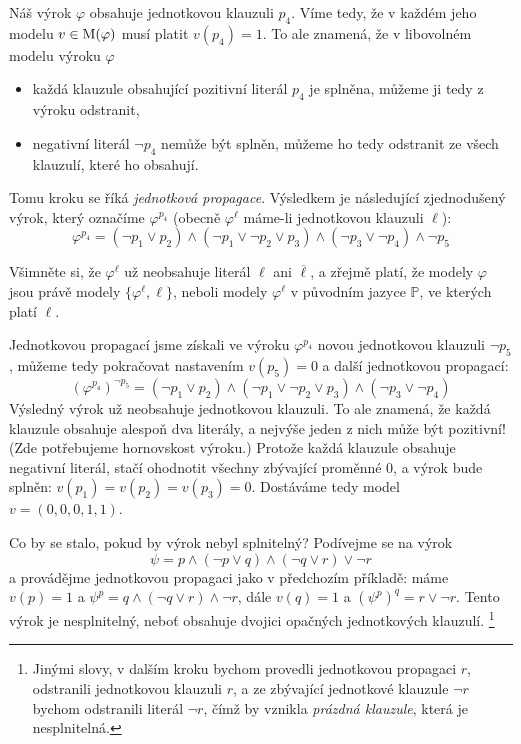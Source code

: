 Náš výrok $\varphi$ obsahuje jednotkovou klauzuli $p_4$. Víme tedy, že v každém jeho modelu $v\in\operatorname{M}(\varphi)$ musí platit $v(p_4)=1$. To ale znamená, že v libovolném modelu výroku $\varphi$
\begin{itemize}
    \item každá klauzule obsahující pozitivní literál $p_4$ je splněna, můžeme ji tedy z výroku odstranit,
    \item negativní literál $\neg p_4$ nemůže být splněn, můžeme ho tedy odstranit ze všech klauzulí, které ho obsahují. 
\end{itemize}
Tomu kroku se říká \emph{jednotková propagace}. Výsledkem je následující zjednodušený výrok, který označíme $\varphi^{p_4}$ (obecně $\varphi^\ell$ máme-li jednotkovou klauzuli $\ell$):
$$
\varphi^{p_4}=(\neg p_1\lor p_2)\land(\neg p_1\lor\neg p_2\lor p_3)\land(\neg p_3\lor\neg p_4)\land\neg p_5
$$
\begin{observation}
Všimněte si, že $\varphi^\ell$ už neobsahuje literál $\ell$ ani $\overline{\ell}$, a zřejmě platí, že modely $\varphi$ jsou právě modely $\{\varphi^{\ell},\ell\}$, neboli modely $\varphi^{\ell}$ v původním jazyce $\mathbb P$, ve kterých platí $\ell$.
\end{observation}

Jednotkovou propagací jsme získali ve výroku $\varphi^{p_4}$ novou jednotkovou klauzuli $\neg p_5$, můžeme tedy pokračovat nastavením $v(p_5)=0$ a další jednotkovou propagací:
$$
(\varphi^{p_4})^{\neg p_5}=(\neg p_1\lor p_2)\land(\neg p_1\lor\neg p_2\lor p_3)\land(\neg p_3\lor\neg p_4)
$$
Výsledný výrok už neobsahuje jednotkovou klauzuli. To ale znamená, že každá klauzule obsahuje alespoň dva literály, a nejvýše jeden z nich může být pozitivní! (Zde potřebujeme hornovskost výroku.) Protože každá klauzule obsahuje negativní literál, stačí ohodnotit všechny zbývající proměnné 0, a výrok bude splněn: $v(p_1)=v(p_2)=v(p_3)=0$. Dostáváme tedy model $v=(0,0,0,1,1)$.

\begin{example}
    Co by se stalo, pokud by výrok nebyl splnitelný? Podívejme se na výrok 
    $$
    \psi=p\land (\neg p\lor q)\land (\neg q\lor r)\lor\neg r
    $$ 
    a provádějme jednotkovou propagaci jako v předchozím příkladě: máme $v(p)=1$ a 
$\psi^p=q\land (\neg q\lor r)\land\neg r$, dále $v(q)=1$ a $(\psi^p)^q=r\lor\neg r$. 
Tento výrok je nesplnitelný, neboť obsahuje dvojici opačných jednotkových klauzulí. \footnote{Jinými slovy, v dalším kroku bychom provedli jednotkovou propagaci $r$, odstranili jednotkovou klauzuli $r$, a ze zbývající jednotkové klauzule $\neg r$ bychom odstranili literál $\neg r$, čímž by vznikla \emph{prázdná klauzule}, která je nesplnitelná.}
\end{example}

